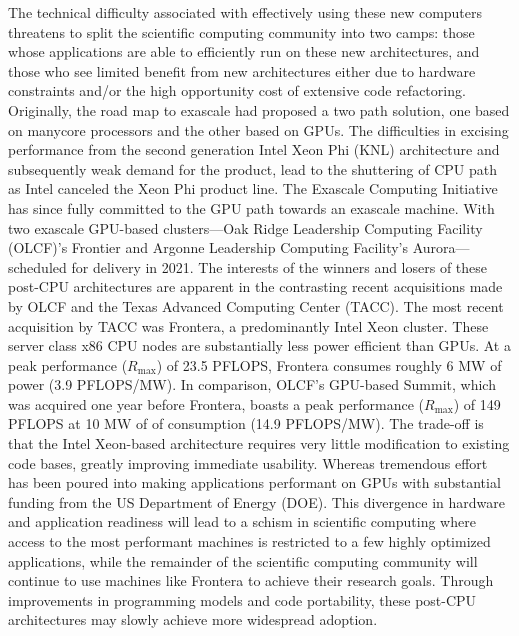 The technical difficulty associated with effectively using these new computers threatens to split the scientific computing community into two camps: those whose applications are able to efficiently run on these new architectures, and those who see limited benefit from new architectures either due to hardware constraints and/or the high opportunity cost of extensive code refactoring. Originally, the road map to exascale had proposed a two path solution, one based on manycore processors and the other based on GPUs. The difficulties in excising performance from the second generation Intel Xeon Phi (KNL) architecture and subsequently weak demand for the product, lead to the shuttering of CPU path as Intel canceled the Xeon Phi product line. The Exascale Computing Initiative has since fully committed to the GPU path towards an exascale machine. With two exascale GPU-based clusters---Oak Ridge Leadership Computing Facility (OLCF)'s Frontier and Argonne Leadership Computing Facility's Aurora---scheduled for delivery in 2021. The interests of the winners and losers of these post-CPU architectures are apparent in the contrasting recent acquisitions made by OLCF and the Texas Advanced Computing Center (TACC). The most recent acquisition by TACC was Frontera, a predominantly Intel Xeon cluster. These server class x86 CPU nodes are substantially less power efficient than GPUs. At a peak performance ($R_{\max}$) of 23.5 PFLOPS, Frontera consumes roughly 6 MW of power (3.9 PFLOPS/MW). In comparison, OLCF's GPU-based Summit, which was acquired one year before Frontera, boasts a peak performance ($R_{\max}$) of 149 PFLOPS at 10 MW of of consumption (14.9 PFLOPS/MW). The trade-off is that the Intel Xeon-based architecture requires very little modification to existing code bases, greatly improving immediate usability. Whereas tremendous effort has been poured into making applications performant on GPUs with substantial funding from the US Department of Energy (DOE). This divergence in hardware and application readiness will lead to a schism in scientific computing where access to the most performant machines is restricted to a few highly optimized applications, while the remainder of the scientific computing community will continue to use machines like Frontera to achieve their research goals. Through improvements in programming models and code portability, these post-CPU architectures may slowly achieve more widespread adoption.

